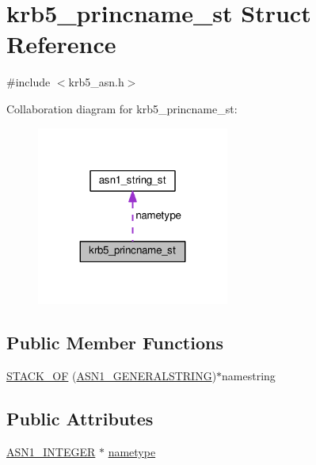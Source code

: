\hypertarget{structkrb5__princname__st}{}\section{krb5\+\_\+princname\+\_\+st Struct Reference}
\label{structkrb5__princname__st}


{\ttfamily \#include $<$krb5\+\_\+asn.\+h$>$}



Collaboration diagram for krb5\+\_\+princname\+\_\+st\+:
\nopagebreak
\begin{figure}[H]
\begin{center}
\leavevmode
\includegraphics[width=179pt]{structkrb5__princname__st__coll__graph}
\end{center}
\end{figure}
\subsection*{Public Member Functions}
\begin{DoxyCompactItemize}
\item 
\hyperlink{structkrb5__princname__st_a7fc43d15e006e5fe1fa4ece16361f68a}{S\+T\+A\+C\+K\+\_\+\+OF} (\hyperlink{ossl__typ_8h_a7357d22f3b42ad606a72aad7f1668dd3}{A\+S\+N1\+\_\+\+G\+E\+N\+E\+R\+A\+L\+S\+T\+R\+I\+NG})$\ast$namestring
\end{DoxyCompactItemize}
\subsection*{Public Attributes}
\begin{DoxyCompactItemize}
\item 
\hyperlink{ossl__typ_8h_af4335399bf9774cb410a5e93de65998b}{A\+S\+N1\+\_\+\+I\+N\+T\+E\+G\+ER} $\ast$ \hyperlink{structkrb5__princname__st_a0cc37375579e858fd5956ec1d824a8c2}{nametype}
\end{DoxyCompactItemize}



